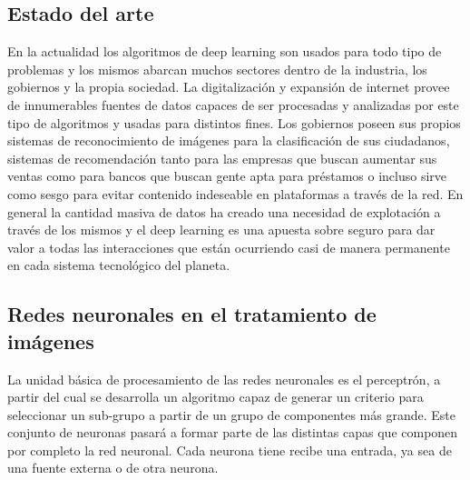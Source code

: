 \subsection{Estado del arte}\label{subsec:estado-del-arte}
En la actualidad los algoritmos de deep learning son usados para todo tipo de problemas y los mismos abarcan muchos sectores dentro de la industria, los gobiernos y la propia sociedad.
La digitalización y expansión de internet provee de innumerables fuentes de datos capaces de ser procesadas y analizadas por este tipo de algoritmos y usadas para distintos fines.
Los gobiernos poseen sus propios sistemas de reconocimiento de imágenes para la clasificación de sus ciudadanos,
sistemas de recomendación tanto para las empresas que buscan aumentar sus ventas como para bancos que buscan gente apta para préstamos o incluso sirve como sesgo para evitar
contenido indeseable en plataformas a través de la red.
En general la cantidad masiva de datos ha creado una necesidad de explotación a través de los mismos y el deep learning es una apuesta sobre seguro para dar valor
a todas las interacciones que están ocurriendo casi de manera permanente en cada sistema tecnológico del planeta.


\subsection{Redes neuronales en el tratamiento de imágenes}\label{subsec:redes-neuronales-en-el-tratamiento-de-imágenes}
La unidad básica de procesamiento de las redes neuronales es el perceptrón, a partir del cual
se desarrolla un algoritmo capaz de generar un criterio para seleccionar un sub-grupo a partir de un grupo de componentes más grande.
Este conjunto de neuronas pasará a formar parte de las distintas capas que componen por completo la red neuronal.
Cada neurona tiene recibe una entrada, ya sea de una fuente externa o de otra neurona.

